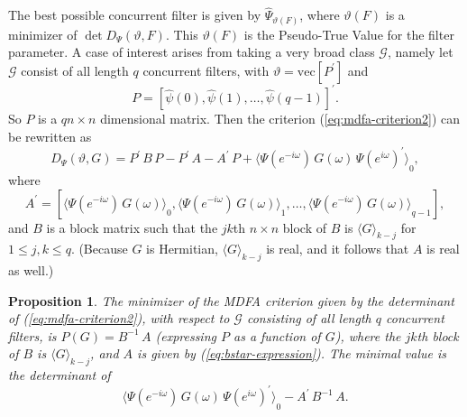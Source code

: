 \documentclass[a4paper]{book}
\newtheorem{Proposition}{Proposition}
\begin{document}
The  best possible concurrent filter is  given by
 $\widehat{\Psi}_{\vartheta (F)}$,
  where $\vartheta (F)$ is a minimizer of
  $\det D_{\Psi} (\vartheta, F)$.  This $\vartheta (F)$ is the
 Pseudo-True Value  for the filter parameter.
A   case of interest arises from taking a very broad class $\mathcal{G}$, namely
  let $\mathcal{G}$ consist of all length $q$ concurrent filters, with 
$\vartheta =  \mbox{vec} [ P^{\prime}]$ and 
\begin{equation}
\label{eq:conc.filter}
  P  =  {\left[  \widehat{\psi} (0), \widehat{\psi} (1), \ldots, 
  \widehat{\psi} (q-1) \right] }^{\prime}.
\end{equation}
 So $P$ is  a   $ q n \times n$ dimensional matrix.
 Then the criterion (\ref{eq:mdfa-criterion2}) can be rewritten as
\begin{equation}
\label{eq:mdfa-crit.linear}
 D_{\Psi} (\vartheta, G)  = P^{\prime} \, B \, P -
   P^{\prime} \, A - 
   A^{\prime} \, P + { \langle \Psi (e^{-i \omega}) \, 
   G (\omega) \, { \Psi (e^{i \omega}) }^{\prime} \rangle }_0,
\end{equation}
 where 
\begin{equation}
 \label{eq:bstar-expression}
  A^{\prime}  = \left[ { \langle \Psi (e^{-i \omega}) \, G (\omega) 
  \rangle }_{0}, { \langle \Psi (e^{-i \omega}) \, G (\omega) \rangle }_{1},
  \ldots, { \langle \Psi (e^{-i \omega}) \, G (\omega) \rangle }_{q-1} \right],
\end{equation}
  and $B$ is a block matrix such that  the $jk$th $n \times n$ block of $B$  is 
  ${ \langle G \rangle }_{k-j}$ for $1 \leq j,k \leq q$.  (Because $G$ is Hermitian,
 ${ \langle G \rangle }_{k-j}$ is real, and it follows that $A$ is real as well.)



\begin{Proposition}
\label{prop:mdfa.quadsoln2}
 The minimizer of the   MDFA criterion given by the determinant 
 of (\ref{eq:mdfa-criterion2}),
  with respect to $\mathcal{G}$ consisting of all length $q$ concurrent filters,  is
  $ P (G) = B^{-1} \, A$ (expressing $P$ as a function of $G$),
 where the $jk$th  block of $B$   is    ${ \langle G \rangle }_{k-j}$,
 and $A$ is given by (\ref{eq:bstar-expression}).
 The minimal value is the determinant of
\begin{equation}
\label{eq:opt.val.mdfa2}
{ \langle \Psi (e^{-i \omega}) \, G (\omega) \, { \Psi (e^{i \omega}) }^{\prime} \rangle }_0 - A^{\prime} \, B^{-1} \, A.
\end{equation}
\end{Proposition}
\end{document}
